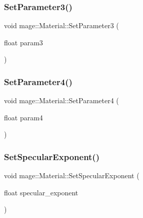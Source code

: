 \hypertarget{structmage_1_1_material_ae79a7b52c3c2ac2b6038276493d09f11}{}\label{structmage_1_1_material_ae79a7b52c3c2ac2b6038276493d09f11} 
\subsubsection{\texorpdfstring{Set\+Parameter3()}{SetParameter3()}}
{\footnotesize\ttfamily void mage\+::\+Material\+::\+Set\+Parameter3 (\begin{DoxyParamCaption}\item[{float}]{param3 }\end{DoxyParamCaption})\hspace{0.3cm}{\ttfamily [noexcept]}}

\hypertarget{structmage_1_1_material_a964eddafac7f3cab4bae60ed6c8429f2}{}\label{structmage_1_1_material_a964eddafac7f3cab4bae60ed6c8429f2} 
\subsubsection{\texorpdfstring{Set\+Parameter4()}{SetParameter4()}}
{\footnotesize\ttfamily void mage\+::\+Material\+::\+Set\+Parameter4 (\begin{DoxyParamCaption}\item[{float}]{param4 }\end{DoxyParamCaption})\hspace{0.3cm}{\ttfamily [noexcept]}}

\hypertarget{structmage_1_1_material_a078a2c9388993523e29f287e20385b3f}{}\label{structmage_1_1_material_a078a2c9388993523e29f287e20385b3f} 
\subsubsection{\texorpdfstring{Set\+Specular\+Exponent()}{SetSpecularExponent()}}
{\footnotesize\ttfamily void mage\+::\+Material\+::\+Set\+Specular\+Exponent (\begin{DoxyParamCaption}\item[{float}]{specular\+\_\+exponent }\end{DoxyParamCaption})\hspace{0.3cm}{\ttfamily [noexcept]}}

